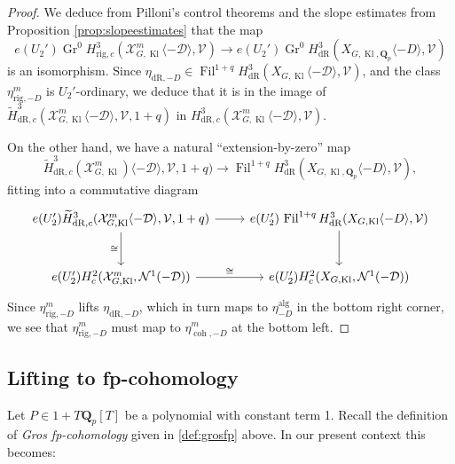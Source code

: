\documentclass[cjm]{ipart}
\theoremstyle{plain}
\theoremstyle{remark}
\DeclareMathOperator{\alg}{alg}
\DeclareMathOperator{\coh}{coh}
\DeclareMathOperator{\Fil}{Fil}
\DeclareMathOperator{\Gr}{Gr}
\DeclareMathOperator{\Kl}{Kl}
\newcommand{\QQ}{\mathbf{Q}}
\newcommand{\Qp}{\QQ_p}
\newcommand{\cD}{\mathcal{D}}
\newcommand{\cN}{\mathcal{N}}
\newcommand{\cV}{\mathcal{V}}
\newcommand{\cX}{\mathcal{X}}
\newcommand{\dR}{\mathrm{dR}}
\newcommand{\rig}{\mathrm{rig}}
\newcommand{\wH}{\widetilde{H}}
\numberwithin{equation}{subsection}
\begin{document}
  \begin{proof}
   We deduce from Pilloni's control theorems \cite{pilloni20} and the slope estimates from Proposition \ref{prop:slopeestimates} that the map
   \[ e(U_2')\Gr^0 H^3_{\rig,c}(\cX^m_{G,\Kl}\langle -\cD\rangle,\cV)\longrightarrow e(U_2')\Gr^0 H^3_{\dR}(X_{G,\Kl,\Qp}\langle -D\rangle,\cV)\]
   is an isomorphism. Since $\eta_{\dR,-D}\in \Fil^{1+q} H^3_{\dR}(X_{G,\Kl}\langle -\cD\rangle,\cV)$, and the class $\eta^m_{\rig,-D}$ is $U_2'$-ordinary, we deduce that it is in the image of $\wH^3_{\dR,c}(\cX^m_{G,\Kl}\langle -\cD\rangle,\cV,1+q)$ in $H^3_{\dR,c}(\cX^m_{G,\Kl}\langle -\cD\rangle,\cV)$.

   On the other hand, we have a natural ``extension-by-zero'' map
   \[ \wH^3_{\dR,c}(\cX^m_{G,\Kl})\langle -\cD\rangle,\cV,1+q) \to \Fil^{1+q} H^3_{\dR}(X_{G,\Kl,\Qp}\langle -D\rangle,\cV), \]
   fitting into a commutative diagram
   \[
    \begin{tikzcd}[row sep=large]
     e(U_2')\wH^3_{\dR,c}(\cX^m_{G,\Kl}\langle -\cD\rangle,\cV,1+q)
       \arrow[r]
       \arrow[d, "\cong"']
     &
     e(U_2')\,\Fil^{1+q}H^3_{\dR}(X_{G,\Kl}\langle -D\rangle,\cV)
       \arrow[d]
     \\
     e(U_2')H^2_c(\cX^{m}_{G,\Kl},\cN^1(-\cD))
       \arrow[r, "\cong"]
     &
     e(U_2')H^2_c(X_{G,\Kl},\cN^1(-\cD))
    \end{tikzcd}
   \]
   Since $\eta^m_{\rig,-D}$ lifts $\eta_{\dR, -D}$, which in turn maps to $\eta^{\alg}_{-D}$ in the bottom right corner, we see that $\eta^m_{\rig,-D}$ must map to $\eta^m_{\coh, -D}$ at the bottom left.
  \end{proof}

 \subsection{Lifting to fp-cohomology}\label{sect:liftingfp}

  Let $P \in 1 + T \Qp[T]$ be a polynomial with constant term 1. Recall the definition of \emph{Gros fp-cohomology} given in \cref{def:grosfp} above. In our present context this becomes:
\end{document}

